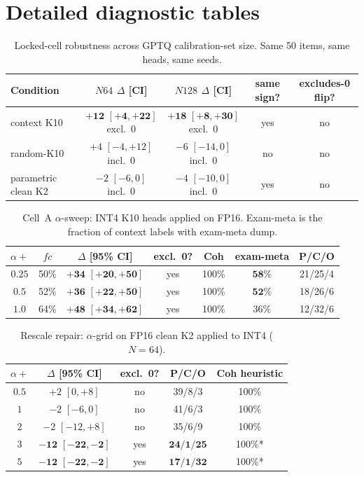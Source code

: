 \documentclass{article} %
\begin{document}
\section{Detailed diagnostic tables}
\label{app:diagnostics}

\begin{table}[h]
\caption{Locked-cell robustness across GPTQ calibration-set size. Same 50 items, same heads, same seeds.}
\label{tab:n64-n128}
\centering
\footnotesize
\begin{tabular}{lcccc}
\toprule
Condition & $N64$ $\Delta$ [CI] & $N128$ $\Delta$ [CI] & same sign? & excludes-0 flip? \\
\midrule
context K10 & $\mathbf{+12}$ $\mathbf{[+4, +22]}$ excl.\ 0 & $\mathbf{+18}$ $\mathbf{[+8, +30]}$ excl.\ 0 & yes & no \\
random-K10 & $+4$ $[-4, +12]$ incl.\ 0 & $-6$ $[-14, 0]$ incl.\ 0 & no & no \\
parametric clean K2 & $-2$ $[-6, 0]$ incl.\ 0 & $-4$ $[-10, 0]$ incl.\ 0 & yes & no \\
\bottomrule
\end{tabular}
\end{table}

\begin{table}[h]
\caption{Cell~A $\alpha$-sweep: INT4 K10 heads applied on FP16. Exam-meta is the fraction of context labels with exam-meta dump.}
\label{tab:cell-a-alpha}
\centering\small
\begin{tabular}{ccccccc}
\toprule
$\alpha{+}$ & $fc$ & $\Delta$ [95\% CI] & excl.\ 0? & Coh & exam-meta & P/C/O \\
\midrule
$0.25$ & 50\% & $\mathbf{+34}$ $\mathbf{[+20,+50]}$ & yes & 100\% & $\mathbf{58\%}$ & 21/25/4 \\
$0.5$ & 52\% & $\mathbf{+36}$ $\mathbf{[+22,+50]}$ & yes & 100\% & $\mathbf{52\%}$ & 18/26/6 \\
$1.0$ & 64\% & $\mathbf{+48}$ $\mathbf{[+34,+62]}$ & yes & 100\% & 36\% & 12/32/6 \\
\bottomrule
\end{tabular}
\end{table}

\begin{table}[h]
\caption{Rescale repair: $\alpha$-grid on FP16 clean K2 applied to INT4 ($N{=}64$).}
\label{tab:alpha-grid}
\centering\small
\begin{tabular}{ccccc}
\toprule
$\alpha{+}$ & $\Delta$ [95\% CI] & excl.\ 0? & P/C/O & Coh heuristic \\
\midrule
$0.5$ & $+2$ $[0,+8]$ & no & 39/8/3 & 100\% \\
$1$ & $-2$ $[-6,0]$ & no & 41/6/3 & 100\% \\
$2$ & $-2$ $[-12,+8]$ & no & 35/6/9 & 100\% \\
$3$ & $\mathbf{-12}$ $\mathbf{[-22,-2]}$ & yes & $\mathbf{24/1/25}$ & 100\%* \\
$5$ & $\mathbf{-12}$ $\mathbf{[-22,-2]}$ & yes & $\mathbf{17/1/32}$ & 100\%* \\
\bottomrule
\end{tabular}
\end{table}
\end{document}

